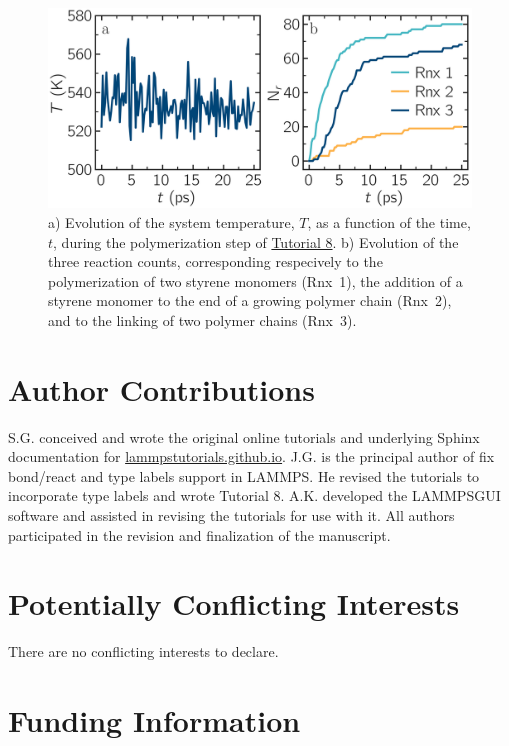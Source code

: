 \documentclass[9pt,tutorial]{livecoms}
\newcommand{\lmpcmd}[1]{\hspace{0pt}\colorbox{listing}{\textcolor{command}{\small{#1}}}\hspace{0pt}} %
\newcommand{\lammpsgui}{\textsf{LAMMPS\textendash GUI}}
\begin{document}
\begin{figure}
\centering
\includegraphics[width=\linewidth]{REACT-reacting}
\caption{a) Evolution of the system temperature, $T$,
as a function of the time, $t$, during the polymerization step of
\hyperref[bond-react-label]{Tutorial 8}.
b) Evolution of the three reaction counts, corresponding respecively to
the polymerization of two styrene monomers (Rnx~1), the  addition of a styrene
monomer to the end of a growing polymer chain (Rnx~2), and to the linking
of two polymer chains (Rnx~3).}
\label{fig:evolution-reacting}
\end{figure}

\section*{Author Contributions}

S.G. conceived and wrote the original online tutorials and underlying Sphinx documentation
for \href{https://lammpstutorials.github.io}{lammpstutorials.github.io}.
J.G. is the principal author of \lmpcmd{fix bond/react} and \lmpcmd{type labels}
support in LAMMPS.  He revised the tutorials to incorporate type labels and wrote Tutorial 8.
A.K. developed the \lammpsgui{} software and assisted in revising the
tutorials for use with it.  All authors participated in the revision and finalization
of the manuscript.

\section*{Potentially Conflicting Interests}

There are no conflicting interests to declare.

\section*{Funding Information}
\end{document}
